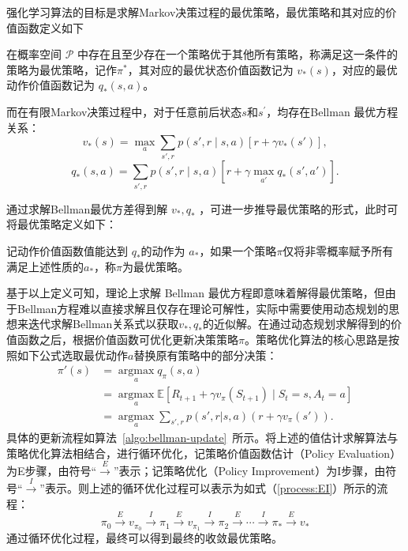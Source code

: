 强化学习算法的目标是求解Markov决策过程的最优策略，最优策略和其对应的价值函数定义如下
\begin{definition}
    在概率空间 $\mathcal{P}$ 中存在且至少存在一个策略优于其他所有策略，称满足这一条件的策略为最优策略，记作$\pi^*$，其对应的最优状态价值函数记为 $v_*(s)$，对应的最优动作价值函数记为 $q_*(s,a)$。
\end{definition}

而在有限Markov决策过程中，对于任意前后状态$s$和$s^\prime$，均存在Bellman 最优方程关系\cite{white1963dynamic}：
\begin{equation}\label{eq:v_star}
    v_*(s)=\max_{a}\sum_{s',r}p(s',r \mid s,a)[r+\gamma v_*(s')],
\end{equation}
\begin{equation}\label{eq:q_star}
q_*(s,a) = \sum_{s',r}p(s',r \mid s,a)\left[r+\gamma \max_{a'}q_*(s',a') \right].
\end{equation}

通过求解Bellman最优方差得到解 $v_*,q_*$ ，可进一步推导最优策略的形式，此时可将最优策略定义如下：
\begin{definition}
    记动作价值函数值能达到 $q_*$的动作为 $a_*$，如果一个策略$\pi$仅将非零概率赋予所有满足上述性质的$a_*$，称$\pi$为最优策略。
\end{definition}

基于以上定义可知，理论上求解 Bellman 最优方程即意味着解得最优策略，但由于Bellman方程难以直接求解且仅存在理论可解性，实际中需要使用动态规划的思想来迭代求解Bellman关系式以获取$v_*,q_*$的近似解\cite{sutton2018reinforcement}。在通过动态规划求解得到的价值函数之后，根据价值函数可优化更新决策策略$\pi$。策略优化算法的核心思路是按照如下公式选取最优动作$a$替换原有策略中的部分决策：
\begin{equation}
    \begin{aligned}
    \pi'(s) &= \mathop{\arg\max}\limits_a q_\pi(s, a)\\&=\mathop{\arg\max}\limits_a \mathbb{E}[R_{t+1}+\gamma v_\pi(S_{t+1})\mid S_t=s,A_t=a] \\&= \mathop{\arg\max}\limits_a \sum_{s',r} p(s', r | s, a) (r + \gamma v_\pi(s')).
    \end{aligned}
\end{equation}
具体的更新流程如算法~\ref{algo:bellman-update}~所示。将上述的值估计求解算法与策略优化算法相结合，进行循环优化，记策略价值函数估计（Policy Evaluation）为E步骤，由符号“$\xrightarrow{E}$”表示；记策略优化（Policy Improvement）为I步骤，由符号“$\xrightarrow{I}$”表示。则上述的循环优化过程可以表示为如式（\ref{process:EI}）所示的流程：
\begin{equation}\label{process:EI}
\pi_0 \xrightarrow{E} v_{\pi_0} \xrightarrow{I}\pi_1 \xrightarrow{E} v_{\pi_1} \xrightarrow{I} \pi_2 \xrightarrow{E} \cdots \xrightarrow{I} \pi_* \xrightarrow{E} v_*
\end{equation}
通过循环优化过程，最终可以得到最终的收敛最优策略。

